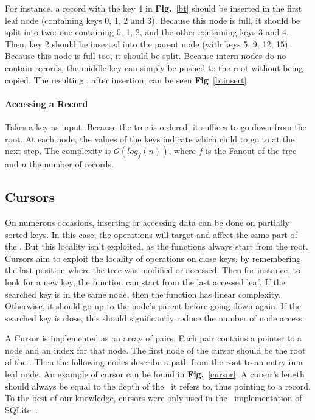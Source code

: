 For instance, a record with the key 4 in \textbf{Fig.}~\ref{bt} should be inserted in the first leaf node (containing keys 0, 1, 2 and 3).
Because this node is full, it should be split into two: one containing 0, 1, 2, and the other containing keys 3 and 4.
Then, key 2 should be inserted into the parent node (with keys 5, 9, 12, 15).
Because this node is full too, it should be split.
Because intern nodes do no contain records, the middle key can simply be pushed to the root without being copied.
The resulting \btree, after insertion, can be seen \textbf{Fig}~\ref{btinsert}.

\beforeinsert
\afterinsert

\paragraph{Accessing a Record} Takes a key as input. Because the tree is ordered, it suffices to go down from the root.
At each node, the values of the keys indicate which child to go to at the next step.
The complexity is $\mathcal{O}(log_{f}(n))$, where $f$ is the Fanout of the tree and $n$ the number of records.

\subsection{Cursors}
On numerous occasions, inserting or accessing data can be done on partially sorted keys.
In this case, the operations will target and affect the same part of the \btree.
But this locality isn't exploited, as the functions always start from the root.
Cursors aim to exploit the locality of operations on close keys, by remembering the last position where the tree was modified or accessed.
Then for instance, to look for a new key, the function can start from the last accessed leaf. If the searched key is in the same node, then the function has linear complexity.
Otherwise, it should go up to the node's parent before going down again. If the searched key is close, this should significantly reduce the number of node access.

A Cursor is implemented as an array of pairs. Each pair contains a pointer to a node and an index for that node.
The first node of the cursor should be the root of the \btree.
Then the following nodes describe a path from the root to an entry in a leaf node.
An example of cursor can be found in \textbf{Fig.}~\ref{cursor}.
A cursor's length should always be equal to the depth of the \btree\ it refers to, thus pointing to a record.
To the best of our knowledge, cursors were only used in the \btrees\ implementation of SQLite~\cite{sqlite}.

